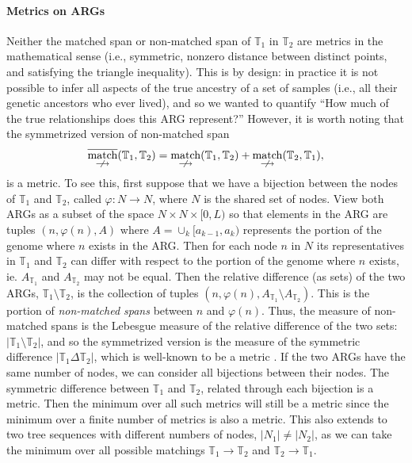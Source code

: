 \documentclass[10pt,twoside,lineno]{gsajnl}
\newcommand{\T}{\mathbb{T}}
\newcommand{\nmatch}{\underset{\centernot\longrightarrow}{\operatorname{match}}}
\begin{document}
\paragraph{Metrics on ARGs} 
Neither the matched span or non-matched span of $\T_1$ in $\T_2$ are metrics in the mathematical sense
(i.e., symmetric, nonzero distance between distinct points, and satisfying the triangle inequality).
This is by design: in practice it is not possible to infer all aspects
of the true ancestry of a set of samples (i.e., all their genetic ancestors who ever lived),
and so we wanted to quantify
``How much of the true relationships does this ARG represent?''
However, it is worth noting that the symmetrized version of non-matched span
$$\overline{\nmatch}(\T_1,\T_2) = \nmatch(\T_1,\T_2) + \nmatch(\T_2, \T_1),$$
 is a metric.
 To see this, first suppose that we have a bijection between the nodes of $\T_1$ and $\T_2$, called $\varphi\colon N\to N$, where $N$ is the shared set of nodes.
 View both ARGs as a subset of the space $N\times N\times [0,L)$ so that elements in the ARG are tuples $(n, \varphi(n), A)$ where $A=\cup_k [a_{k-1}, a_k)$ represents the portion of the genome where $n$ exists in the ARG.
 Then for each node $n$ in $N$ its representatives in $\T_1$ and $\T_2$ can differ with respect to the portion of the genome where $n$ exists, ie. $A_{\T_1}$ and $A_{\T_2}$ may not be equal.
 Then the relative difference (as sets) of the two ARGs, $\T_1\setminus \T_2$, is the collection of tuples $(n, \varphi(n), A_{\T_1}\setminus A_{\T_2})$. This is the portion of \emph{non-matched spans} between $n$ and $\varphi(n)$.
Thus, the measure of non-matched spans
is the Lebesgue measure of the relative difference of the two sets:
$|\T_1 \setminus \T_2|$,
and so the symmetrized version is the measure of the symmetric difference
$|\T_1\Delta\T_2|$,
which is well-known to be a metric \citep{rudin1976principles}. 
If the two ARGs have the same number of nodes,
we can consider all bijections between their nodes.
The symmetric difference between $\T_1$ and $\T_2$,
related through each bijection is a metric.
Then the minimum over all such metrics will still be a metric
since the minimum over a finite number of metrics is also a metric.
This also extends to two tree sequences with different numbers of nodes,
$|N_1|\neq|N_2|$, as we can take the minimum over all possible matchings $\T_1\to\T_2$ and $\T_2\to\T_1$.
\end{document}
